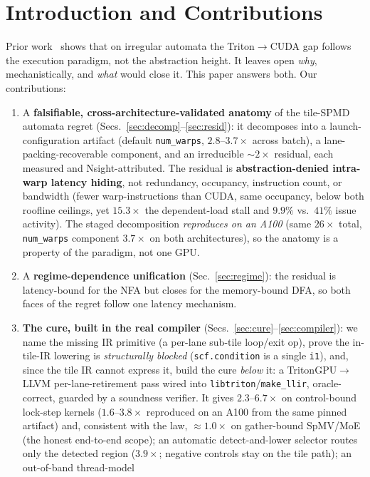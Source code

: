 \documentclass[sigplan,review,anonymous,10pt]{acmart}
\begin{document}
\section{Introduction and Contributions}
Prior work~\cite{paper1} shows that on irregular automata the Triton$\rightarrow$CUDA gap
follows the execution paradigm, not the abstraction height. It leaves open \emph{why}, mechanistically,
and \emph{what} would close it. This paper answers both. Our contributions:
\begin{enumerate}
\item A \textbf{falsifiable, cross-architecture-validated anatomy} of the tile-SPMD automata regret
(Secs.~\ref{sec:decomp}--\ref{sec:resid}): it decomposes into a launch-configuration artifact
(default \texttt{num\_warps}, $2.8$--$3.7\times$ across batch), a lane-packing-recoverable component,
and an irreducible ${\sim}2\times$ residual, each measured and Nsight-attributed. The residual is
\textbf{abstraction-denied intra-warp latency hiding}, not redundancy, occupancy, instruction count,
or bandwidth (fewer warp-instructions than CUDA, same occupancy, below both roofline ceilings, yet
$15.3\times$ the dependent-load stall and $9.9\%$ vs.\ $41\%$ issue activity). The staged decomposition
\emph{reproduces on an A100} (same $26\times$ total, \texttt{num\_warps} component $3.7\times$ on both
architectures), so the anatomy is a property of the paradigm, not one GPU.
\item A \textbf{regime-dependence unification} (Sec.~\ref{sec:regime}): the residual is latency-bound
for the NFA but closes for the memory-bound DFA, so both faces of the regret follow one latency mechanism.
\item \textbf{The cure, built in the real compiler} (Secs.~\ref{sec:cure}--\ref{sec:compiler}): we name
the missing IR primitive (a per-lane sub-tile loop/exit op), prove the in-tile-IR lowering is
\emph{structurally blocked} (\texttt{scf.condition} is a single \texttt{i1}), and, since the tile IR
cannot express it, build the cure \emph{below} it: a \mbox{TritonGPU$\rightarrow$LLVM} per-lane-retirement
pass wired into \texttt{libtriton}/\texttt{make\_llir}, oracle-correct, guarded by a soundness verifier.
It gives $2.3$--$6.7\times$ on control-bound lock-step kernels ($1.6$--$3.8\times$ reproduced on an
A100 from the same pinned artifact) and, consistent with the law, ${\approx}1.0\times$ on gather-bound
SpMV/MoE (the honest end-to-end scope); an automatic detect-and-lower selector routes only
the detected region ($3.9\times$; negative controls stay on the tile path); an out-of-band thread-model

\end{enumerate}
\end{document}
